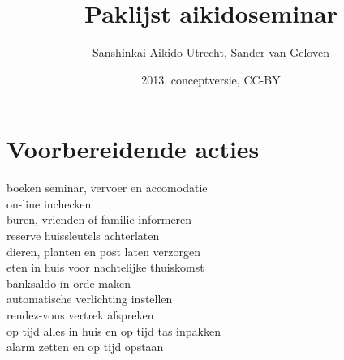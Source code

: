 \documentclass[9pt,twocolumn]{memoir}
\begin{document}
\title{\Huge\bfseries Paklijst aikidoseminar}
\author{Sanshinkai Aikido Utrecht, Sander van Geloven}
\date{2013, conceptversie, CC-BY}
\maketitle

\section*{Voorbereidende acties}
boeken seminar, vervoer en accomodatie\\
on-line inchecken\\
buren, vrienden of familie informeren\\
reserve huissleutels achterlaten\\
dieren, planten en post laten verzorgen\\
eten in huis voor nachtelijke thuiskomst\\
banksaldo in orde maken\\
automatische verlichting instellen\\
rendez-vous vertrek afspreken\\
op tijd alles in huis en op tijd tas inpakken\\
alarm zetten en op tijd opstaan
\end{document}
